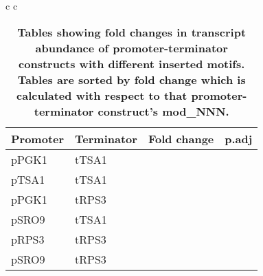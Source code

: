 \documentclass[../main.tex]{subfiles}
\begin{document}
\begin{table}
{\begin{tabular}{ c c }
\begin{tabularx}{0.45\textwidth} { 
  | >{\centering\arraybackslash}X 
  | >{\centering\arraybackslash}X  
  | >{\centering\arraybackslash}X
  | >{\centering\arraybackslash}X | }
\hline
\textbf{Promoter} & \textbf{Terminator} & \textbf{Fold change} & \textbf{p.adj}\\
\hline
pPGK1 & tTSA1 & 0.7338775 & 0.130\\
\hline
pTSA1 & tTSA1 & 0.7371346 & 0.110\\
\hline
pPGK1 & tRPS3 & 0.9530783 & 0.830\\
\hline
pSRO9 & tTSA1 & 1.0705360 & 0.620\\
\hline
pRPS3 & tRPS3 & 1.3474065 & 0.033\\
\hline
pSRO9 & tRPS3 & 1.4012037 & 0.093\\
\hline
\end{tabularx}
\end{tabular}}\endgroup{}\caption[Tables showing fold changes in transcript abundance of promoter-terminator constructs with different inserted motifs.]{\textbf{Tables showing fold changes in transcript abundance of promoter-terminator constructs with different inserted motifs. Tables are sorted by fold change which is calculated with respect to that promoter-terminator construct's mod\_NNN.}}\label{tab:insertion-construct-ttest}\end{table}
\end{document}
